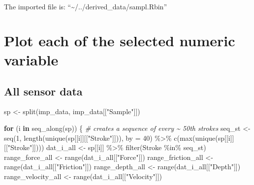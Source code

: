 \documentclass[
]{article}
\newenvironment{Shaded}{\begin{snugshade}}{\end{snugshade}}
\newcommand{\AttributeTok}[1]{\textcolor[rgb]{0.77,0.63,0.00}{#1}}
\newcommand{\CommentTok}[1]{\textcolor[rgb]{0.56,0.35,0.01}{\textit{#1}}}
\newcommand{\ControlFlowTok}[1]{\textcolor[rgb]{0.13,0.29,0.53}{\textbf{#1}}}
\newcommand{\DecValTok}[1]{\textcolor[rgb]{0.00,0.00,0.81}{#1}}
\newcommand{\FunctionTok}[1]{\textcolor[rgb]{0.00,0.00,0.00}{#1}}
\newcommand{\NormalTok}[1]{#1}
\newcommand{\OtherTok}[1]{\textcolor[rgb]{0.56,0.35,0.01}{#1}}
\newcommand{\SpecialCharTok}[1]{\textcolor[rgb]{0.00,0.00,0.00}{#1}}
\newcommand{\StringTok}[1]{\textcolor[rgb]{0.31,0.60,0.02}{#1}}
\begin{document}
The imported file is: ``\textasciitilde/../derived\_data/sampl.Rbin''

\hypertarget{plot-each-of-the-selected-numeric-variable}{%
\section{Plot each of the selected numeric
variable}\label{plot-each-of-the-selected-numeric-variable}}

\hypertarget{all-sensor-data}{%
\subsection{All sensor data}\label{all-sensor-data}}

\begin{Shaded}
\begin{Highlighting}[]
\NormalTok{sp }\OtherTok{\textless{}{-}} \FunctionTok{split}\NormalTok{(imp\_data, imp\_data[[}\StringTok{"Sample"}\NormalTok{]])}

\ControlFlowTok{for}\NormalTok{ (i }\ControlFlowTok{in} \FunctionTok{seq\_along}\NormalTok{(sp)) \{}
  \CommentTok{\# creates a sequence of every \textasciitilde{} 50th strokes }
\NormalTok{  seq\_st }\OtherTok{\textless{}{-}} \FunctionTok{seq}\NormalTok{(}\DecValTok{1}\NormalTok{, }\FunctionTok{length}\NormalTok{(}\FunctionTok{unique}\NormalTok{(sp[[i]][[}\StringTok{"Stroke"}\NormalTok{]])), }\AttributeTok{by =} \DecValTok{40}\NormalTok{) }\SpecialCharTok{\%\textgreater{}\%} 
            \FunctionTok{c}\NormalTok{(}\FunctionTok{max}\NormalTok{(}\FunctionTok{unique}\NormalTok{(sp[[i]][[}\StringTok{"Stroke"}\NormalTok{]])))}
\NormalTok{  dat\_i\_all }\OtherTok{\textless{}{-}}\NormalTok{ sp[[i]] }\SpecialCharTok{\%\textgreater{}\%} 
               \FunctionTok{filter}\NormalTok{(Stroke }\SpecialCharTok{\%in\%}\NormalTok{ seq\_st)}
\NormalTok{  range\_force\_all }\OtherTok{\textless{}{-}} \FunctionTok{range}\NormalTok{(dat\_i\_all[[}\StringTok{"Force"}\NormalTok{]])}
\NormalTok{  range\_friction\_all }\OtherTok{\textless{}{-}} \FunctionTok{range}\NormalTok{(dat\_i\_all[[}\StringTok{"Friction"}\NormalTok{]])}
\NormalTok{  range\_depth\_all }\OtherTok{\textless{}{-}} \FunctionTok{range}\NormalTok{(dat\_i\_all[[}\StringTok{"Depth"}\NormalTok{]])}
\NormalTok{  range\_velocity\_all }\OtherTok{\textless{}{-}} \FunctionTok{range}\NormalTok{(dat\_i\_all[[}\StringTok{"Velocity"}\NormalTok{]])}
       

\end{Highlighting}
\end{Shaded}
\end{document}
